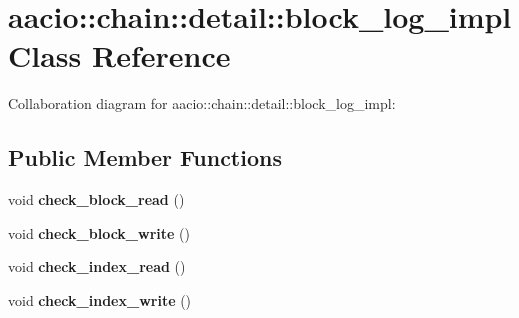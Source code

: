 \hypertarget{classaacio_1_1chain_1_1detail_1_1block__log__impl}{}\section{aacio\+:\+:chain\+:\+:detail\+:\+:block\+\_\+log\+\_\+impl Class Reference}
\label{classaacio_1_1chain_1_1detail_1_1block__log__impl}


Collaboration diagram for aacio\+:\+:chain\+:\+:detail\+:\+:block\+\_\+log\+\_\+impl\+:
\subsection*{Public Member Functions}
\begin{DoxyCompactItemize}
\item 
\mbox{\label{classaacio_1_1chain_1_1detail_1_1block__log__impl_ae4a8e0ecdc262d0f288f434e5c84a144}} 
void {\bfseries check\+\_\+block\+\_\+read} ()
\item 
\mbox{\label{classaacio_1_1chain_1_1detail_1_1block__log__impl_a5744479d1e43ab487bd836afcb358ee1}} 
void {\bfseries check\+\_\+block\+\_\+write} ()
\item 
\mbox{\label{classaacio_1_1chain_1_1detail_1_1block__log__impl_a0002e6b5f8f7d99462fa3680fa504257}} 
void {\bfseries check\+\_\+index\+\_\+read} ()
\item 
\mbox{\label{classaacio_1_1chain_1_1detail_1_1block__log__impl_ab209d27b9ac2862eba5843801a04fb44}} 
void {\bfseries check\+\_\+index\+\_\+write} ()
\end{DoxyCompactItemize}
